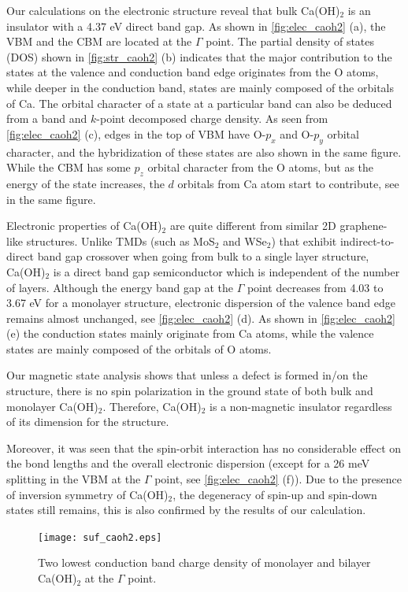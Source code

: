 Our calculations on the electronic structure reveal that bulk Ca(OH)$_2$ is 
an insulator with a 4.37 eV direct band gap. As shown in \autoref{fig:elec_caoh2} (a), the VBM and the CBM are located at the $\Gamma$ point. The partial density of 
states (DOS) shown in \autoref{fig:str_caoh2} (b) indicates that the major 
contribution to the states at the valence and conduction band edge originates 
from the O atoms, while deeper in the conduction band, states are mainly composed 
of the orbitals of Ca. The orbital character of a state at a particular band can 
also be deduced from a band and $k$-point decomposed charge density. As seen 
from \autoref{fig:elec_caoh2} (c), edges in the top of VBM have O-$p_x$ 
and O-$p_y$ orbital character, and the hybridization of these states are also 
shown in the same figure. While the CBM has some $p_z$ orbital 
character from the O atoms, but as the energy of the state increases, the $d$ 
orbitals from Ca atom start to contribute, see  in the same figure.

Electronic properties of Ca(OH)$_2$ are quite different from similar
2D graphene-like structures. Unlike TMDs (such as MoS$_2$ and
WSe$_2$) that exhibit indirect-to-direct band gap crossover when going
from bulk to a single layer structure, Ca(OH)$_2$ is a direct band gap
semiconductor which is independent of the number of layers. Although the energy band gap
at the $\Gamma$ point decreases from 4.03 to 3.67 eV for a monolayer structure,
electronic dispersion of the valence band edge remains almost unchanged, see
\autoref{fig:elec_caoh2} (d). As shown in \autoref{fig:elec_caoh2} (e)  
the conduction states mainly originate from Ca atoms, while the valence states 
are mainly composed of the orbitals of O atoms. 

Our magnetic state analysis shows that unless a defect is formed in/on the 
structure, there is no spin polarization in the ground state of both bulk and monolayer Ca(OH)$_2$. Therefore, Ca(OH)$_2$ is a non-magnetic insulator regardless of its dimension for the structure. 

Moreover, it was seen that the spin-orbit interaction has no 
considerable effect on the bond lengths and the overall electronic dispersion 
(except for a 26 meV splitting in the VBM at the 
$\Gamma$ point, see \autoref{fig:elec_caoh2} (f)). Due to the presence of inversion symmetry of Ca(OH)$_2$, the 
degeneracy of spin-up and spin-down states still remains, this is also confirmed 
by the results of our calculation.

\begin{figure}[htbp]
\centering
\texttt{[image: suf\_caoh2.eps]}
\caption{\label{fig:suf_caoh2} Two lowest conduction band charge density of 
monolayer and bilayer Ca(OH)$_2$ at the $\Gamma$ point.}
\end{figure}


